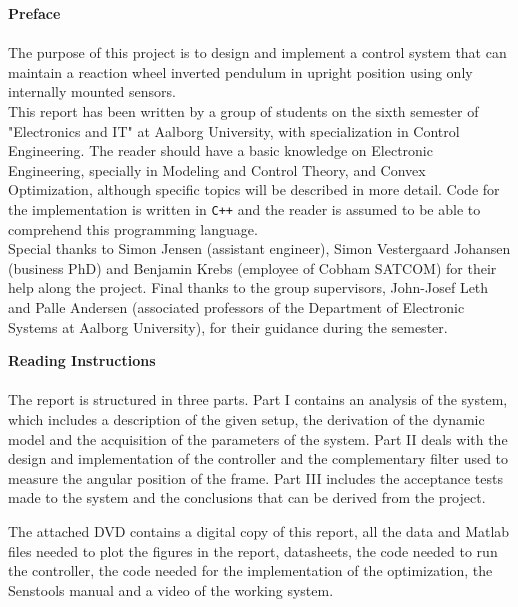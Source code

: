\textbf{\huge{Preface}}
\\
\\
The purpose of this project is to design and implement a control system that can maintain a reaction wheel inverted pendulum in upright position using only internally mounted sensors.\\
This report has been written by a group of students on the sixth semester of "Electronics and IT" at Aalborg University, with specialization in Control Engineering.
The reader should have a basic knowledge on Electronic Engineering, specially in Modeling and Control Theory, and Convex Optimization, although specific topics will be described in more detail. Code for the implementation is written in \texttt{C++} and the reader is assumed to be able to comprehend this programming language. \\
Special thanks to Simon Jensen (assistant engineer), Simon Vestergaard Johansen (business PhD) and Benjamin Krebs (employee of Cobham SATCOM) for their help along the project. Final thanks to the group supervisors, John-Josef Leth and Palle Andersen (associated professors of the Department of Electronic Systems at Aalborg University), for their guidance during the semester.

\textbf{Reading Instructions}\\
\vspace{-6pt}\\
\noindent The report is structured in three parts. Part I contains an analysis of the system, which includes a description of the given setup, the derivation of the dynamic model and the acquisition of the parameters of the system. Part II deals with the design and implementation of the controller and the complementary filter used to measure the angular position of the frame. Part III includes the acceptance tests made to the system and the conclusions that can be derived from the project.

The attached DVD contains a digital copy of this report, all the data and Matlab files needed to plot the figures in the report, datasheets, the code needed to run the controller, the code needed for the implementation of the optimization, the Senstools manual and a video of the working system.  

